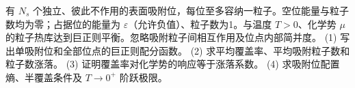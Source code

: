 有 \(N_s\) 个独立、彼此不作用的表面吸附位，每位至多容纳一粒子。空位能量与粒子数均为零；占据位的能量为 \(\varepsilon\)（允许负值）、粒子数为1。与温度 \(T>0\)、化学势 \(\mu\) 的粒子热库达到巨正则平衡。忽略吸附粒子间相互作用及位点内部简并度。
(1) 写出单吸附位和全部位点的巨正则配分函数。
(2) 求平均覆盖率、平均吸附粒子数和粒子数涨落。
(3) 证明覆盖率对化学势的响应等于涨落系数。
(4) 求吸附位配置熵、半覆盖条件及 \(T\to0^+\) 阶跃极限。

